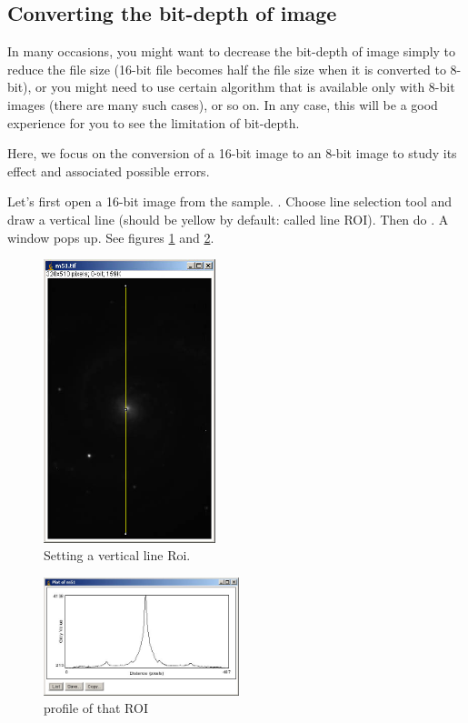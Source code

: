 \subsection{Converting the bit-depth of image}

In many occasions, you might want to decrease the bit-depth of image
simply to reduce the file size (16-bit file becomes half the file size
when it is converted to 8-bit), or you might need to use certain
algorithm that is available only with 8-bit images (there are many such
cases), or so on. In any case, this will be a good experience for you
to see the limitation of bit-depth.

Here, we focus on the conversion of a 16-bit image to an 8-bit image to
study its effect and associated possible errors. 


\begin{indentexercise}{1}
Let's first open a 16-bit image from the sample. 
. Choose line selection tool and draw a vertical line 
(should be yellow by default: called line ROI). Then do . 
A window pops up. See figures \ref{fig:img6} and \ref{fig:img7}.

\begin{figure}[htbp]
\begin{center}
\includegraphics[width=5cm]{img/CMCIBasicCourse201102-img6.jpg}
\caption{Setting a vertical line Roi.}
\label{fig:img6}
\end{center}
\end{figure}

\begin{figure}[htbp]
\begin{center}
\includegraphics[width=5.694cm,height=3.44cm]{img/CMCIBasicCourse201102-img7.jpg}
\caption{profile of that ROI}
\label{fig:img7}
\end{center}
\end{figure}


\end{indentexercise}
